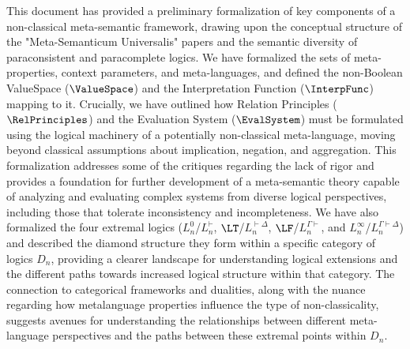 																																																																																					\RaggedRight %
																																																																																					This document has provided a preliminary formalization of key components of a non-classical meta-semantic framework, drawing upon the conceptual structure of the "Meta-Semanticum Universalis" papers and the semantic diversity of paraconsistent and paracomplete logics. We have formalized the sets of meta-properties, context parameters, and meta-languages, and defined the non-Boolean ValueSpace ($\ValueSpace$) and the Interpretation Function ($\InterpFunc$) mapping to it. Crucially, we have outlined how Relation Principles ($\RelPrinciples$) and the Evaluation System ($\EvalSystem$) must be formulated using the logical machinery of a potentially non-classical meta-language, moving beyond classical assumptions about implication, negation, and aggregation. This formalization addresses some of the critiques regarding the lack of rigor and provides a foundation for further development of a meta-semantic theory capable of analyzing and evaluating complex systems from diverse logical perspectives, including those that tolerate inconsistency and incompleteness. We have also formalized the four extremal logics ($L^0_n$/$L^{\vdash}_n$, $\LT$/$L^{\vdash\Delta}_n$, $\LF$/$L^{\Gamma\vdash}_n$, and $L^\infty_n$/$L^{\Gamma\vdash\Delta}_n$) and described the diamond structure they form within a specific category of logics $D_n$, providing a clearer landscape for understanding logical extensions and the different paths towards increased logical structure within that category. The connection to categorical frameworks and dualities, along with the nuance regarding how metalanguage properties influence the type of non-classicality, suggests avenues for understanding the relationships between different meta-language perspectives and the paths between these extremal points within $D_n$.
